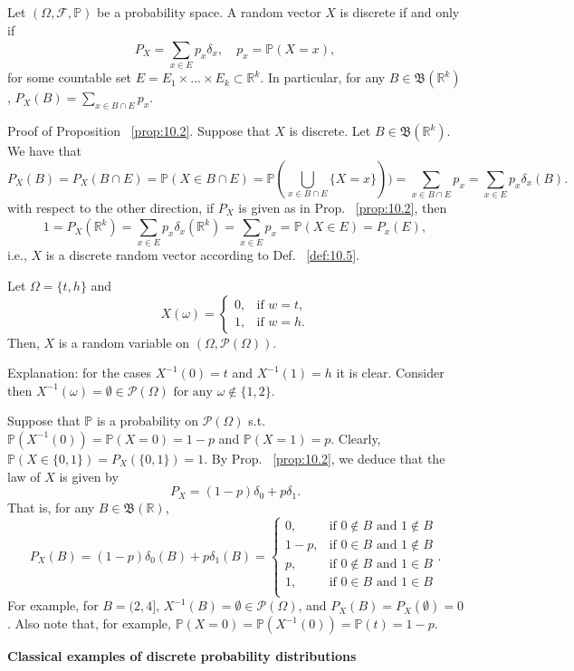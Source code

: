 \begin{proposition}
    \label{prop:10.2}
    Let $(\Omega, \mathcal{F}, \mathbb{P})$ be a probability space. A random vector $X$ is discrete if
    and only if
    \[
    P_X = \sum_{x \in E}^{} p_x {\delta}_x, \quad p_x = \mathbb{P}(X = x)
    ,\] 
    for some countable set $E = E_1 \times \ldots \times E_k \subset \mathbb{R}^{k}$. In particular, for
    any $B \in  \mathfrak{B}(\mathbb{R}^{k})$, $P_X(B) = \sum_{x \in B \cap E}^{} p_x$.
\end{proposition}

Proof of Proposition ~\ref{prop:10.2}. Suppose that $X$ is discrete. Let $B \in 
\mathfrak{B}(\mathbb{R}^{k})$. We have that
\[
P_X(B) = P_X(B \cap E) = \mathbb{P}(X \in B \cap E) 
= \mathbb{P}(\bigcup_{x \in B \cap E}\{X = x\} ) ) = \sum_{x \in B\cap E}^{ } p_x
= \sum_{x \in E}^{ } p_x {\delta}_x(B)
.\] 
with respect to the other direction, if $P_X$ is given as in Prop. ~\ref{prop:10.2}, then
\[
1 = P_X(\mathbb{R}^{k}) = \sum_{x \in E}^{ } p_x {\delta}_x(\mathbb{R}^{k})
= \sum_{x \in E}^{ } p_x = \mathbb{P}(X \in E) = P_x(E)
,\] 
i.e., $X$ is a discrete random vector according to Def. ~\ref{def:10.5}.

\begin{example}
    \label{ex:Tail,_head}
    Let $\Omega = \{t, h\} $ and
    \[
    X(\omega) = 
    \begin{cases}
        0, & \text{if } w=t, \\
        1, & \text{if } w = h.
    \end{cases}
    \] 
    Then, $X$ is a random variable on $(\Omega, \mathcal{P}(\Omega))$.

    Explanation: for the cases $X^{-1}(0) = t$ and $X^{-1}(1) = h$ it is clear. Consider then 
    $X^{-1}(\omega) = \emptyset \in \mathcal{P}(\Omega) \text{ for any } \omega \not\in \{1, 2\} $.

    Suppose that $\mathbb{P}$ is a probability on $\mathcal{P}(\Omega)$ s.t. $\mathbb{P}(X^{-1}(0)) 
    = \mathbb{P}(X=0) = 1-p$ and $\mathbb{P}(X=1)=p$.     
    Clearly, $\mathbb{P}(X \in \{0,1\} ) = P_X(\{0,1\} ) = 1$. By Prop. ~\ref{prop:10.2}, we deduce
    that the law of $X$ is given by
    \[
    P_X = (1-p) \delta _0 + p\delta _1
    .\] 
    That is, for any $B \in \mathfrak{B}(\mathbb{R})$,
    \[
    P_X(B)= (1-p) \delta _0(B) + p\delta _1(B)=
    \begin{cases}
        0, & \text{if } 0 \not\in B \text{ and } 1 \not\in B \\
        1-p, & \text{if } 0 \in B \text{ and } 1 \not\in B \\
        p, & \text{if } 0 \not\in B \text{ and } 1 \in B \\
        1, & \text{if } 0 \in B \text{ and } 1 \in B \\
    \end{cases}
    .\] 
    For example, for $B = (2, 4]$, $X^{-1}(B) = \emptyset \in \mathcal{P}(\Omega)$, and
    $P_X(B) = P_X(\emptyset) = 0$. Also note that, for example, $\mathbb{P}(X=0) 
    = \mathbb{P}(X^{-1}(0)) = \mathbb{P}(t) = 1-p$.
\end{example}
\textbf{Classical examples of discrete probability distributions}

